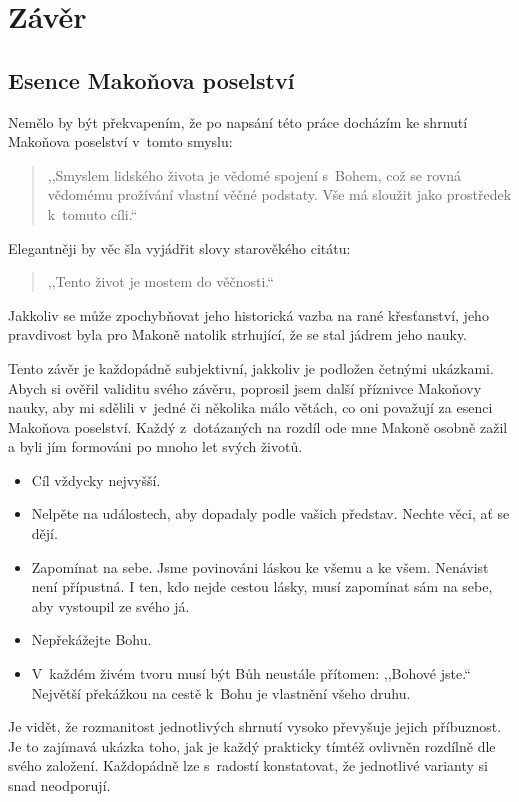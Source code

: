 \chapter{Závěr}

\section{Esence Makoňova poselství}

Nemělo by být překvapením, že po napsání této práce docházím ke shrnutí Makoňova
poselství v~tomto smyslu:
\begin{quote}
,,Smyslem lidského života je vědomé spojení s~Bohem,
což se rovná vědomému prožívání vlastní věčné podstaty. Vše má sloužit jako
prostředek k~tomuto cíli.``
\end{quote}
Elegantněji by věc šla vyjádřit slovy starověkého citátu:
\begin{quote}
,,Tento život je mostem do věčnosti.``
\end{quote}
Jakkoliv se může zpochybňovat jeho historická vazba na rané
křesťanství\cite{dus2001neznama}, jeho pravdivost byla pro Makoně natolik
strhující, že se stal jádrem jeho nauky.

Tento závěr je každopádně subjektivní, jakkoliv je podložen četnými ukázkami.
Abych si ověřil validitu svého závěru, poprosil jsem další příznivce Makoňovy
nauky, aby mi sdělili v~jedné či několika málo větách, co oni považují za esenci
Makoňova poselství. Každý z~dotázaných na rozdíl ode mne Makoně osobně zažil a
byli jím formováni po mnoho let svých životů.

\begin{itemize}
\item{Cíl vždycky nejvyšší.}
\item{Nelpěte na událostech, aby dopadaly podle vašich představ. Nechte věci, ať
  se dějí.}
\item{Zapomínat na sebe. Jsme povinováni láskou ke všemu a ke všem. Nenávist
  není přípustná. I ten, kdo nejde cestou lásky, musí zapomínat sám na sebe, aby
    vystoupil ze svého já.}
\item{Nepřekážejte Bohu.}
\item{V~každém živém tvoru musí být Bůh neustále přítomen: ,,Bohové jste.``
  Největší překážkou na cestě k~Bohu je vlastnění všeho druhu.}
\end{itemize}

Je vidět, že rozmanitost jednotlivých shrnutí vysoko převyšuje jejich
příbuznost. Je to zajímavá ukázka toho, jak je každý prakticky tímtéž ovlivněn
rozdílně dle svého založení. Každopádně lze s~radostí konstatovat, že jednotlivé
varianty si snad neodporují.

